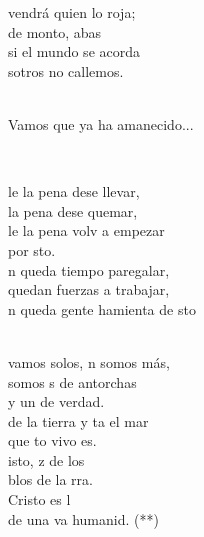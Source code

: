 \documentclass[12pt]{article}
\begin{document}
\begin{multicols*}{2}
\begin{cancion}
	 vendrá quien lo roja;\\
	de monto, abas\\
	si el mundo se acorda\\
	sotros no callemos.\\\jump\\
	\begin{chorus}%
Vamos que ya ha amanecido...\\
	\end{chorus}%
	\jump\\
\end{cancion}%

\begin{cancion}%
	le la pena dese llevar,\\
	 la pena dese quemar,\\
	le la pena volv a empezar \\
	por sto. \\
\jump
	n queda tiempo paregalar, \\
	 quedan fuerzas a trabajar,\\
	n queda gente hamienta de sto\\\jump\\
	\begin{chorus}%
	 vamos solos, n somos más,\\
	somos s de antorchas \\
	y un  de verdad.\\
	de la tierra y ta el mar\\
	que to vivo es. \\
\jump
	isto, z de los \\
	blos de la rra.\\
	Cristo es l \\
	de una va humanid. (**)\\
	\end{chorus}%

\end{cancion}
\end{multicols*}
\end{document}
